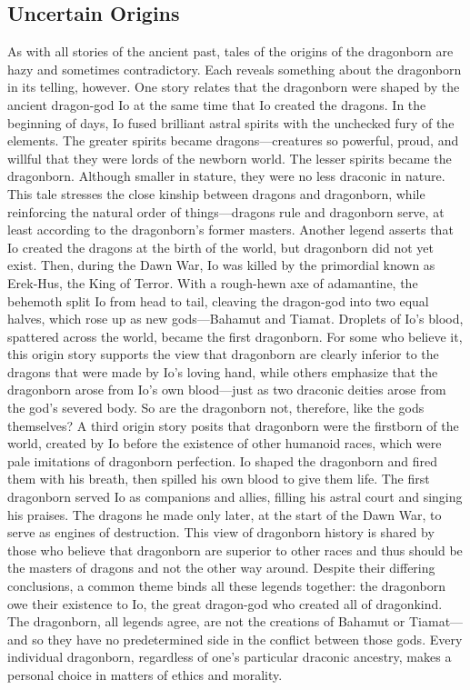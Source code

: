 \documentclass[10pt,a4paper,twoside,twocolumn,openany,bg=print,nodeprecatedcode]{dndbook}
\begin{document}
\subsection{Uncertain Origins}
As with all stories of the ancient past, tales of the origins of the dragonborn are hazy and sometimes contradictory. Each reveals something about the dragonborn in its telling, however.
One story relates that the dragonborn were shaped by the ancient dragon-god Io at the same time that Io created the dragons. In the beginning of days, Io fused brilliant astral spirits with the unchecked fury of the elements. The greater spirits became dragons—creatures so powerful, proud, and willful that they were lords of the newborn world. The lesser spirits became the dragonborn. Although smaller in stature, they were no less draconic in nature. This tale stresses the close kinship between dragons and dragonborn, while reinforcing the natural order of things—dragons rule and dragonborn serve, at least according to the dragonborn's former masters.
Another legend asserts that Io created the dragons at the birth of the world, but dragonborn did not yet exist. Then, during the Dawn War, Io was killed by the primordial known as Erek-Hus, the King of Terror. With a rough-hewn axe of adamantine, the behemoth split Io from head to tail, cleaving the dragon-god into two equal halves, which rose up as new gods—Bahamut and Tiamat. Droplets of Io's blood, spattered across the world, became the first dragonborn. For some who believe it, this origin story supports the view that dragonborn are clearly inferior to the dragons that were made by Io's loving hand, while others emphasize that the dragonborn arose from Io's own blood—just as two draconic deities arose from the god's severed body. So are the dragonborn not, therefore, like the gods themselves?
A third origin story posits that dragonborn were the firstborn of the world, created by Io before the existence of other humanoid races, which were pale imitations of dragonborn perfection. Io shaped the dragonborn and fired them with his breath, then spilled his own blood to give them life. The first dragonborn served Io as companions and allies, filling his astral court and singing his praises. The dragons he made only later, at the start of the Dawn War, to serve as engines of destruction. This view of dragonborn history is shared by those who believe that dragonborn are superior to other races and thus should be the masters of dragons and not the other way around.
Despite their differing conclusions, a common theme binds all these legends together: the dragonborn owe their existence to Io, the great dragon-god who created all of dragonkind. The dragonborn, all legends agree, are not the creations of Bahamut or Tiamat—and so they have no predetermined side in the conflict between those gods. Every individual dragonborn, regardless of one's particular draconic ancestry, makes a personal choice in matters of ethics and morality.
\end{document}
